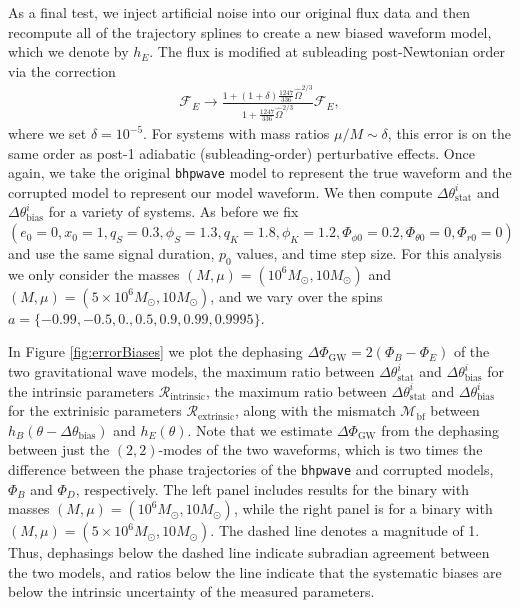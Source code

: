 \documentclass[%
 reprint,
 nofootinbib,
 amsmath,amssymb,
 aps,
 prd,
]{revtex4-2}
\begin{document}
As a final test, we inject artificial noise into our original flux data and then recompute all of the trajectory splines to create a new biased waveform model, which we denote by $h_E$. The flux is modified at subleading post-Newtonian order via the correction
\begin{align}
    \mathcal{F}_E \rightarrow \frac{1 + (1 + \delta)\frac{1247}{336}\hat{\Omega}^{2/3}}{1 + \frac{1247}{336}\hat{\Omega}^{2/3}} \mathcal{F}_E,
\end{align}
where we set $\delta = 10^{-5}$. For systems with mass ratios $\mu/M \sim \delta$, this error is on the same order as post-1 adiabatic (subleading-order) perturbative effects. Once again, we take the original \texttt{bhpwave} model to represent the true waveform and the corrupted model to represent our model waveform. We then compute $\Delta \theta^i_\mathrm{stat}$ and $\Delta \theta^i_\mathrm{bias}$ for a variety of systems. As before we fix $(e_0 = 0, x_0 = 1, q_S = 0.3, \phi_S = 1.3, q_K = 1.8, \phi_K = 1.2, \Phi_{\phi 0} = 0.2, \Phi_{\theta0} = 0, \Phi_{r0} = 0)$ and use the same signal duration, $p_0$ values, and time step size. For this analysis we only consider the masses $(M, \mu) = (10^6 M_\odot, 10 M_\odot)$ and $(M, \mu) = (5\times 10^6 M_\odot, 10 M_\odot)$, and we vary over the spins $a = \{-0.99, -0.5, 0., 0.5, 0.9, 0.99, 0.9995\}$.

In Figure \ref{fig:errorBiases} we plot the dephasing $\Delta \Phi_\mathrm{GW} = 2(\Phi_B - \Phi_E)$ of the two gravitational wave models, the maximum ratio between $\Delta \theta^i_\mathrm{stat}$ and $\Delta \theta^i_\mathrm{bias}$ for the intrinsic parameters $\mathcal{R}_\mathrm{intrinsic}$, the maximum ratio between $\Delta \theta^i_\mathrm{stat}$ and $\Delta \theta^i_\mathrm{bias}$ for the extrinisic parameters $\mathcal{R}_\mathrm{extrinsic}$, along with the mismatch $\mathcal{M}_\mathrm{bf}$ between $h_B(\theta-\Delta \theta_\mathrm{bias})$ and $h_E(\theta)$. Note that we estimate $\Delta \Phi_\mathrm{GW}$ from the dephasing between just the $(2,2)$-modes of the two waveforms, which is two times the difference between the phase trajectories of the \texttt{bhpwave} and corrupted models, $\Phi_B$ and $ \Phi_D$, respectively. The left panel includes results for the binary with masses $(M, \mu) = (10^6 M_\odot, 10 M_\odot)$, while the right panel is for a binary with $(M, \mu) = (5\times 10^6 M_\odot, 10 M_\odot)$. The dashed line denotes a magnitude of 1. Thus, dephasings below the dashed line indicate subradian agreement between the two models, and ratios below the line indicate that the systematic biases are below the intrinsic uncertainty of the measured parameters.
\end{document}
